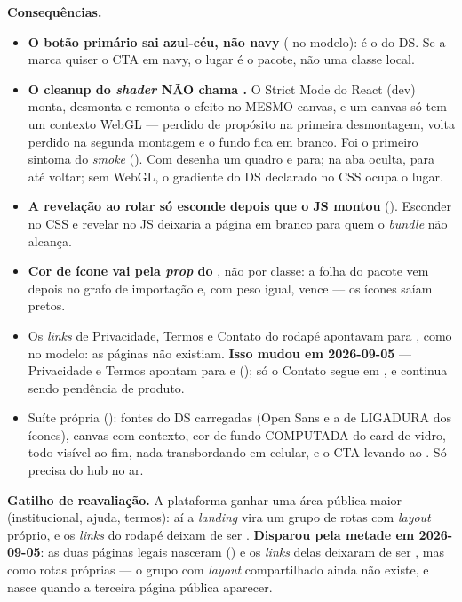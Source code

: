 \textbf{Consequências.}
\begin{itemize}
  \item \textbf{O botão primário sai azul-céu, não navy} ( no
    modelo): é o  do DS. Se a marca quiser o CTA em navy, o lugar é o
    pacote, não uma classe local.
  \item \textbf{O cleanup do \emph{shader} NÃO chama .} O
    Strict Mode do React (dev) monta, desmonta e remonta o efeito no MESMO
    canvas, e um canvas só tem um contexto WebGL --- perdido de propósito na
    primeira desmontagem, volta perdido na segunda montagem e o fundo fica em
    branco. Foi o primeiro sintoma do \emph{smoke}
    (). Com  desenha um quadro
    e para; na aba oculta, para até voltar; sem WebGL, o gradiente do DS
    declarado no CSS ocupa o lugar.
  \item \textbf{A revelação ao rolar só esconde depois que o JS montou}
    (). Esconder no CSS e revelar no JS deixaria a página
    em branco para quem o \emph{bundle} não alcança.
  \item \textbf{Cor de ícone vai pela \emph{prop}  do }, não
    por classe: a folha do pacote vem depois no grafo de importação e, com peso
    igual, vence --- os ícones saíam pretos.
  \item Os \emph{links} de Privacidade, Termos e Contato do rodapé apontavam
    para \cd{\#}, como no modelo: as páginas não existiam. \textbf{Isso mudou
    em 2026-09-05} --- Privacidade e Termos apontam para  e
     (); só o Contato segue em \cd{\#}, e continua
    sendo pendência de produto.
  \item Suíte própria (): fontes do
    DS carregadas (Open Sans e a de LIGADURA dos ícones), canvas com contexto,
    cor de fundo COMPUTADA do card de vidro, todo  visível
    ao fim, nada transbordando em celular, e o CTA levando ao . Só
    precisa do hub no ar.
\end{itemize}

\textbf{Gatilho de reavaliação.} A plataforma ganhar uma área pública maior
(institucional, ajuda, termos): aí a \emph{landing} vira um grupo de rotas
 com \emph{layout} próprio, e os \emph{links} do rodapé deixam de
ser \cd{\#}. \textbf{Disparou pela metade em 2026-09-05}: as duas páginas legais
nasceram () e os \emph{links} delas deixaram de ser \cd{\#}, mas
como rotas próprias --- o grupo  com \emph{layout} compartilhado
ainda não existe, e nasce quando a terceira página pública aparecer.

